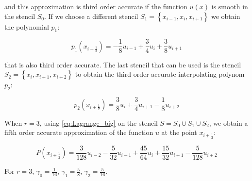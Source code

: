 and this approximation is third order accurate if the function $u(x)$ is smooth in the stencil $S_0$. If we choose a different stencil $S_1=\left\{ x_{i-1}, x_{i}, x_{i+1} \right\}$ we obtain the polynomial $p_1$:

\begin{equation}
  \label{eq:pol_1}
  p_1(x_{i+\frac{1}{2}}) = -\frac{1}{8} u_{i-1} + \frac{3}{4} u_i + \frac{3}{8} u_{i+1}
\end{equation}

that is also third order accurate. The last stencil that can be used is the stencil $S_2=\left\{ x_{i}, x_{i+1}, x_{i+2} \right\}$ to obtain the third order accurate interpolating polynom $p_2$:

\begin{equation}
  \label{eq:pol_2}
  p_2(x_{i+\frac{1}{2}}) = \frac{3}{8} u_i + \frac{3}{4} u_{i+1} - \frac{1}{8} u_{i+2}
\end{equation}

When $r=3$, using \eqref{eq:Lagrange_big} on the stencil $S= S_0 \cup S_1 \cup S_2$, we obtain a fifth order accurate approximation of the function $u$ at the point $x_{i+\frac{1}{2}}$:

\begin{equation}
  \label{eq:pol_union}
  P(x_{i+\frac{1}{2}}) = \frac{3}{128} u_{i-2} - \frac{5}{32} u_{i-1} + \frac{45}{64} u_i + \frac{15}{32} u_{i+1} - \frac{5}{128} u_{i+2}
\end{equation}

For $r=3$, $\gamma_0 = \frac{1}{16}$, $\gamma_1 = \frac{5}{8}$, $\gamma_2 = \frac{5}{16}$.
